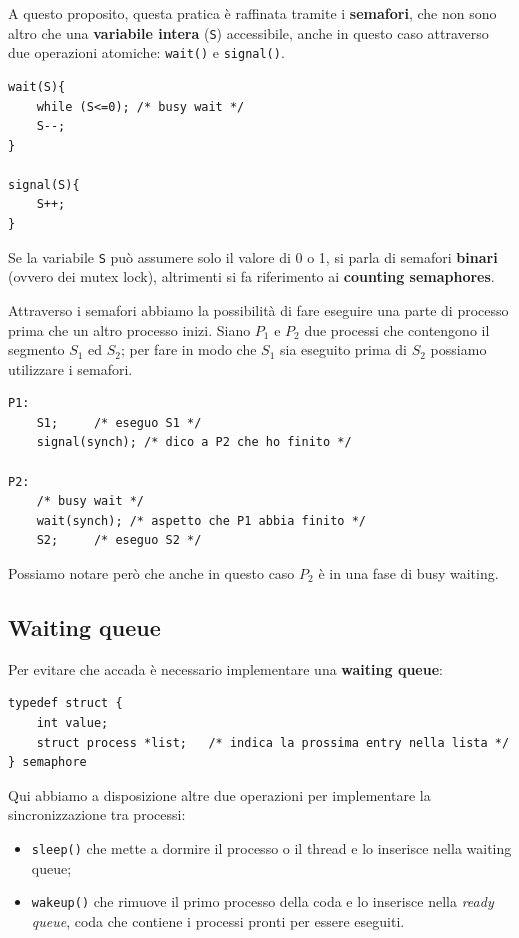 A questo proposito, questa pratica è raffinata tramite i \textbf{semafori}, che non sono altro che una \textbf{variabile intera} (\texttt{S}) accessibile, anche in questo caso attraverso due operazioni atomiche: \texttt{wait()} e \texttt{signal()}.
\begin{lstlisting}
wait(S){
    while (S<=0); /* busy wait */
    S--;
}

signal(S){
    S++;
}
\end{lstlisting}
Se la variabile \texttt{S} può assumere solo il valore di 0 o 1, si parla di semafori \textbf{binari} (ovvero dei mutex lock), altrimenti si fa riferimento ai \textbf{counting semaphores}. 

Attraverso i semafori abbiamo la possibilità di fare eseguire una parte di processo prima che un altro processo inizi. Siano $P_1$ e $P_2$ due processi che contengono il segmento $S_1$ ed $S_2$; per fare in modo che $S_1$ sia eseguito prima di $S_2$ possiamo utilizzare i semafori.
\begin{lstlisting}
P1:
    S1;     /* eseguo S1 */
    signal(synch); /* dico a P2 che ho finito */

P2:
    /* busy wait */
    wait(synch); /* aspetto che P1 abbia finito */
    S2;     /* eseguo S2 */
\end{lstlisting}
Possiamo notare però che anche in questo caso $P_2$ è in una fase di busy waiting.

\subsection{Waiting queue}
Per evitare che accada è necessario implementare una \textbf{waiting queue}:
\begin{lstlisting}[caption={Struttura del semaforo con waiting queue}]
typedef struct {
    int value;
    struct process *list;   /* indica la prossima entry nella lista */
} semaphore
\end{lstlisting}
Qui abbiamo a disposizione altre due operazioni per implementare la sincronizzazione tra processi:
\vspace{-5px}
\begin{itemize}
\setlength{\itemsep}{-.15 em}
    \item \texttt{sleep()} che mette a dormire il processo o il thread e lo inserisce nella waiting queue;
    \item \texttt{wakeup()} che rimuove il primo processo della coda e lo inserisce nella \textit{ready queue}, coda che contiene i processi pronti per essere eseguiti.
\end{itemize}


